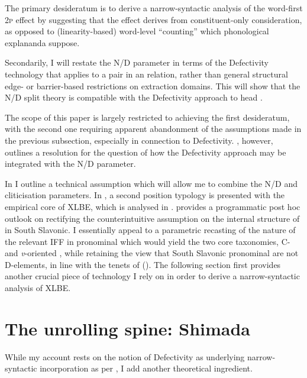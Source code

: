 \documentclass[output=paper]{langsci/langscibook}
\begin{document}
The primary desideratum is to derive a narrow-syntactic analysis of the
word-first \textsc{2p} effect by suggesting that the effect derives from
constituent-only consideration, as opposed to (linearity-based) word-level
\enquote{counting} which phonological explananda suppose.

Secondarily, I will restate the N/D parameter in terms of the Defectivity
technology that applies to a pair in an  relation, rather than general
structural edge- or barrier-based restrictions on extraction domains.  This
will show that the N/D split theory is compatible with the Defectivity approach
to head .

The scope of this paper is largely restricted to achieving the first
desideratum, with the second one requiring apparent abandonment of the
assumptions made in the previous subsection, especially in connection to
Defectivity. , however, outlines a resolution for the
question of how the Defectivity approach may be integrated with the N/D
parameter.

In  I outline a technical assumption which will allow me to
combine the N/D and cliticisation parameters. In , a second
position typology is presented with the empirical core of XLBE, which is
analysed in .  provides a programmatic post hoc
outlook on rectifying the counterintuitive assumption on the internal structure
of  in South Slavonic. I essentially appeal to a parametric recasting of
the nature of the relevant \gls{IFF} in pronominal  which would yield
the two core taxonomies, C- and \emph{v}-oriented , while
retaining the view that South Slavonic pronominal  are not
D-elements, in line with the tenets of \citeauthor{Boskovic:2001b}
(\citeyear{Boskovic:2001b,Boskovic:2004c,Boskovic:2005,Boskovic:2009b}).  The
following section first provides another crucial piece of technology I rely on
in order to derive a narrow-syntactic analysis of XLBE.

\section{The unrolling spine: Shimada
\citeyearpar{Shimada:2007}}\label{sec:shimada}

While my account rests on the notion of Defectivity as underlying
nar\-row-syn\-tac\-tic incorporation as per \citet{Roberts2010}, I add another
theoretical ingredient.
\end{document}
